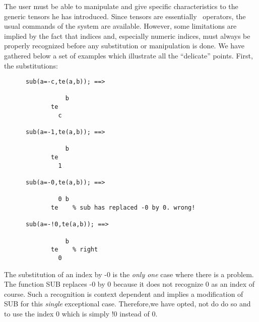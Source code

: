 
The user must be able to manipulate and give specific characteristics 
to the generic tensors he has introduced.  Since tensors are essentially 
\REDUCE\  operators, the usual commands of the system are 
available.
However, some limitations are implied by the fact that indices and,
especially numeric indices, must always be properly recognized before
any substitution or manipulation is done. We have gathered below a set of 
examples which illustrate all the ``delicate'' points.
First, the substitutions:
\begin{verbatim}
      sub(a=-c,te(a,b)); ==>

                 b
             te
               c

      sub(a=-1,te(a,b)); ==>

                 b
             te
               1

      sub(a=-0,te(a,b)); ==> 
  
               0 b
             te    % sub has replaced -0 by 0. wrong! 

      sub(a=-!0,te(a,b)); ==>

                 b
             te    % right  
               0     

\end{verbatim}
The substitution of an index  by -0 is the \emph{only one} case where 
there is a problem. The function SUB replaces -0 by 0 because it does 
not  recognize 0 as an index of course. Such a recognition is 
context dependent and implies a modification of SUB
for this \emph{single} exceptional case. Therefore,we have opted, not do do so 
and to use the index 0 which is simply !0 instead of 0. 

